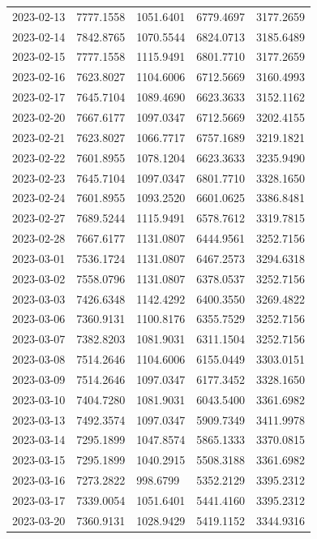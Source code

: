 \begin{footnotesize}
\begin{longtable}{lllll}
2023-02-13 & 7777.1558 & 1051.6401 & 6779.4697 & 3177.2659 \\
2023-02-14 & 7842.8765 & 1070.5544 & 6824.0713 & 3185.6489 \\
2023-02-15 & 7777.1558 & 1115.9491 & 6801.7710 & 3177.2659 \\
2023-02-16 & 7623.8027 & 1104.6006 & 6712.5669 & 3160.4993 \\
2023-02-17 & 7645.7104 & 1089.4690 & 6623.3633 & 3152.1162 \\
2023-02-20 & 7667.6177 & 1097.0347 & 6712.5669 & 3202.4155 \\
2023-02-21 & 7623.8027 & 1066.7717 & 6757.1689 & 3219.1821 \\
2023-02-22 & 7601.8955 & 1078.1204 & 6623.3633 & 3235.9490 \\
2023-02-23 & 7645.7104 & 1097.0347 & 6801.7710 & 3328.1650 \\
2023-02-24 & 7601.8955 & 1093.2520 & 6601.0625 & 3386.8481 \\
2023-02-27 & 7689.5244 & 1115.9491 & 6578.7612 & 3319.7815 \\
2023-02-28 & 7667.6177 & 1131.0807 & 6444.9561 & 3252.7156 \\
2023-03-01 & 7536.1724 & 1131.0807 & 6467.2573 & 3294.6318 \\
2023-03-02 & 7558.0796 & 1131.0807 & 6378.0537 & 3252.7156 \\
2023-03-03 & 7426.6348 & 1142.4292 & 6400.3550 & 3269.4822 \\
2023-03-06 & 7360.9131 & 1100.8176 & 6355.7529 & 3252.7156 \\
2023-03-07 & 7382.8203 & 1081.9031 & 6311.1504 & 3252.7156 \\
2023-03-08 & 7514.2646 & 1104.6006 & 6155.0449 & 3303.0151 \\
2023-03-09 & 7514.2646 & 1097.0347 & 6177.3452 & 3328.1650 \\
2023-03-10 & 7404.7280 & 1081.9031 & 6043.5400 & 3361.6982 \\
2023-03-13 & 7492.3574 & 1097.0347 & 5909.7349 & 3411.9978 \\
2023-03-14 & 7295.1899 & 1047.8574 & 5865.1333 & 3370.0815 \\
2023-03-15 & 7295.1899 & 1040.2915 & 5508.3188 & 3361.6982 \\
2023-03-16 & 7273.2822 & 998.6799 & 5352.2129 & 3395.2312 \\
2023-03-17 & 7339.0054 & 1051.6401 & 5441.4160 & 3395.2312 \\
2023-03-20 & 7360.9131 & 1028.9429 & 5419.1152 & 3344.9316 \\

\end{longtable}
\end{footnotesize}
